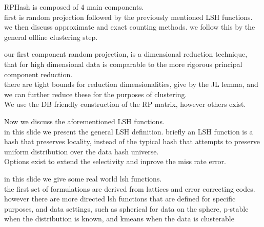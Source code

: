 \documentclass{beamer}
\begin{document}
\begin{frame}[plain]
RPHash is composed of 4 main components. \\

first is random projection followed by
the previously mentioned LSH functions. \\

we then discuss approximate and exact counting
methods. we follow this by the general offline clustering step.
\end{frame}

\begin{frame}[plain]
our first component random projection, is a dimensional reduction technique, that
for high dimensional data is comparable to the more rigorous principal component
reduction.\\

there are tight bounds for reduction dimensionalities, give by the JL
lemma, and we can further reduce these for the purposes of clustering. \\

We use
the DB friendly construction of the RP matrix, however others exist.
\end{frame}

\begin{frame}[plain]
Now we discuss the aforementioned LSH functions. \\

in this slide we present the general
LSH definition. briefly an LSH function is a hash that preserves locality, instead
of the typical hash that attempts to preserve uniform distribution over the data
hash universe. \\

Options exist to extend the selectivity and inprove the miss rate
error.
\end{frame}

\begin{frame}[plain]
in this slide we give some real world lsh functions. \\

the first set of formulations
are derived from lattices and error correcting codes. \\

however there are more
directed lsh functions that are defined for specific purposes, and data settings,
such as spherical for data on the sphere, p-stable when the distribution is known,
and kmeans when the data is clusterable
\end{frame}
\end{document}
